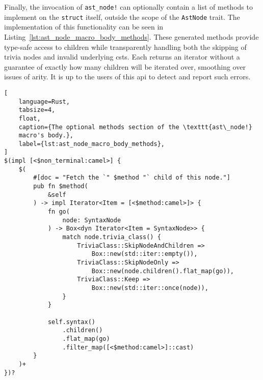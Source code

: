 Finally, the invocation of \texttt{ast\_node!} can optionally contain a list of
methods to implement on the \texttt{struct} itself, outside the scope of the
\texttt{AstNode} trait. The implementation of this functionality can be seen in
Listing~\ref{lst:ast_node_macro_body_methods}. These generated methods provide
type-safe access to children while transparently handling both the skipping of
trivia nodes and invalid underlying \acrshort{cst}s. Each returns an iterator
without a guarantee of exactly how many children will be iterated over,
smoothing over issues of arity. It is up to the users of this \acrshort{api} to
detect and report such errors.

\begin{lstlisting}[
	language=Rust,
	tabsize=4,
	float,
	caption={The optional methods section of the \texttt{ast\_node!}
	macro's body.},
	label={lst:ast_node_macro_body_methods},
]
$(impl [<$non_terminal:camel>] {
	$(
		#[doc = "Fetch the `" $method "` child of this node."]
		pub fn $method(
			&self
		) -> impl Iterator<Item = [<$method:camel>]> {
			fn go(
				node: SyntaxNode
			) -> Box<dyn Iterator<Item = SyntaxNode>> {
				match node.trivia_class() {
					TriviaClass::SkipNodeAndChildren =>
						Box::new(std::iter::empty()),
					TriviaClass::SkipNodeOnly =>
						Box::new(node.children().flat_map(go)),
					TriviaClass::Keep =>
						Box::new(std::iter::once(node)),
				}
			}

			self.syntax()
				.children()
				.flat_map(go)
				.filter_map([<$method:camel>]::cast)
		}
	)+
})?
\end{lstlisting}
